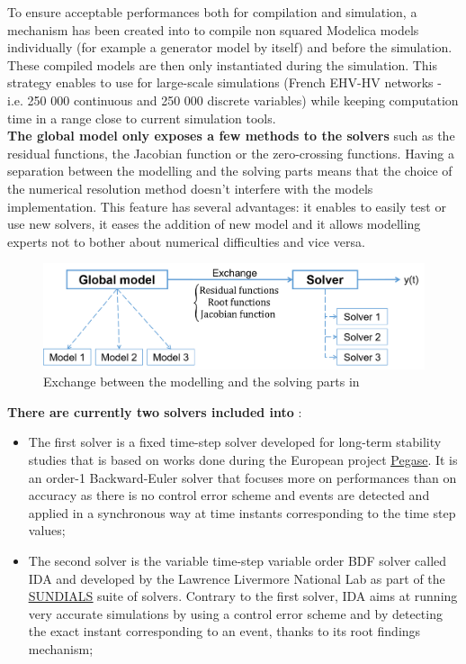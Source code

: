 \documentclass[a4paper, 12pt]{report}
\begin{document}
To ensure acceptable performances both for compilation and simulation, a mechanism has been created into \Dynawo to compile non squared Modelica models individually (for example a generator model by itself) and before the simulation. These compiled models are then only instantiated during the simulation. This strategy enables to use \Dynawo for large-scale simulations (French EHV-HV networks - i.e. 250 000 continuous and 250 000 discrete variables) while keeping computation time in a range close to current simulation tools.\\

\textbf{The global model only exposes a few methods to the solvers} such as the residual functions, the Jacobian function or the zero-crossing functions. Having a separation between the modelling and the solving parts means that the choice of the numerical resolution method doesn't interfere with the models implementation. This feature has several advantages: it enables to easily test or use new solvers, it eases the addition of new model and it allows modelling experts not to bother about numerical difficulties and vice versa.

\begin{figure}[h!]
\centering
\includegraphics[width=\textwidth]{../resources/ExchangeModelSolver.png}
\caption{Exchange between the modelling and the solving parts in \Dynawo}
\end{figure}

\textbf{There are currently two solvers included into \Dynawo}:

\begin{itemize}
\item The first solver is a fixed time-step solver developed for long-term stability studies that is based on works done during the European project \href{http://www.fp7-pegase.com/}{\underline{Pegase}}. It is an order-1 Backward-Euler solver that focuses more on performances than on accuracy as there is no control error scheme and events are detected and applied in a synchronous way at time instants corresponding to the time step values;
\item The second solver is the variable time-step variable order BDF solver called IDA and developed by the Lawrence Livermore National Lab as part of the \href{https://computation.llnl.gov/projects/sundials}{\underline{SUNDIALS}} suite of solvers. Contrary to the first solver, IDA aims at running very accurate simulations by using a control error scheme and by detecting the exact instant corresponding to an event, thanks to its root findings mechanism;
\end{itemize}
\end{document}
